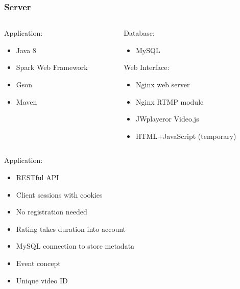 \begin{frame}	
	\frametitle{Server}
	\begin{columns}[t]
		\begin{column}[t]{0.5\linewidth}
			Application:
			\begin{itemize}
				\item Java 8
				\item Spark Web Framework\footnotemark[1]
				\item Gson\footnotemark[2]
				\item Maven\footnotemark[3]
			\end{itemize}
		\end{column}
		\begin{column}[t]{0.5\linewidth}
			Database:
			\begin{itemize}
				\item MySQL
			\end{itemize}
			
			Web Interface:
			\begin{itemize}
				\item Nginx web server\footnotemark[4]
				\item Nginx RTMP module\footnotemark[5]
				\item JWplayer\footnotemark[6] or Video.js\footnotemark[7]
				\item HTML+JavaScript (temporary)
			\end{itemize}
		\end{column}		
	\end{columns}	
	
{\tiny
}
\end{frame}

\begin{frame}	
			Application:
			\begin{itemize}
				\item RESTful API
				\item Client sessions with cookies
				\item No registration needed
				\item Rating takes duration into account
				\item MySQL connection to store metadata
				\item Event concept
				\item Unique video ID
			\end{itemize}
\end{frame}

